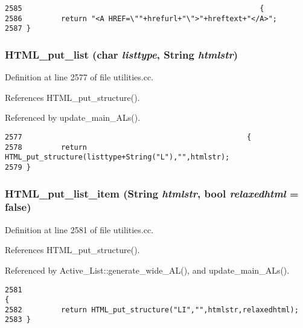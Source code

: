 \footnotesize\begin{verbatim}2585                                                       {
2586         return "<A HREF=\""+hrefurl+"\">"+hreftext+"</A>";
2587 }
\end{verbatim}\normalsize 
{}
\subsubsection{ HTML\_\-put\_\-list (char {\em listtype}, {\bf String} {\em htmlstr})}\label{utilities_8cc_a66}




Definition at line 2577 of file utilities.cc.

References HTML\_\-put\_\-structure().

Referenced by update\_\-main\_\-ALs().



\footnotesize\begin{verbatim}2577                                                    {
2578         return HTML_put_structure(listtype+String("L"),"",htmlstr);
2579 }
\end{verbatim}\normalsize 
{}
\subsubsection{ HTML\_\-put\_\-list\_\-item ({\bf String} {\em htmlstr}, bool {\em relaxedhtml} = {\bf false})}\label{utilities_8cc_a67}




Definition at line 2581 of file utilities.cc.

References HTML\_\-put\_\-structure().

Referenced by Active\_\-List::generate\_\-wide\_\-AL(), and update\_\-main\_\-ALs().



\footnotesize\begin{verbatim}2581                                                                     {
2582         return HTML_put_structure("LI","",htmlstr,relaxedhtml);
2583 }
\end{verbatim}\normalsize 
{}
